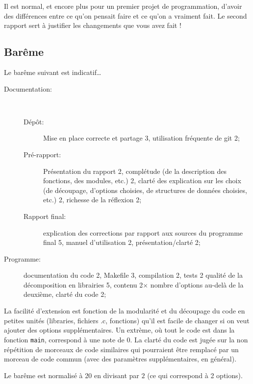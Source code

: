 \documentclass[a4paper]{article}
\begin{document}
Il est normal, et encore plus pour un premier projet de programmation,
d'avoir des différences entre ce qu'on pensait faire et ce qu'on a
vraiment fait. Le second rapport sert à justifier les changements que
vous avez fait ! 

\subsection{Bar\^eme}

Le bar\^eme suivant est indicatif\ldots
\begin{description}
\item[Documentation:] ~
  \begin{description}
  \item[Dépôt:] Mise en place correcte et partage 3, utilisation
    fréquente de git 2;
\item[Pr\'e-rapport:] Pr\'esentation du rapport 2, compl\'etude (de la description
des fonctions, des modules, etc.) 2, clart\'e des explication sur les choix (de
d\'ecoupage, d'options choisies, de structures de donn\'ees choisies, etc.) 2,
richesse de la réflexion 2;
\item[Rapport final:] explication des corrections par rapport aux
  sources du programme final 5, manuel d'utilisation 2, présentation/clart\'e 2;
\end{description}
\item[Programme:] documentation du code 2, Makefile 3, compilation 2,
  tests 2
  qualité de la décomposition en librairies 5, contenu 2$\times$
  nombre d'options au-delà de la deuxième, clarté du code 2;
\end{description}
La facilit\'e d'extension est fonction de la modularit\'e et du
d\'ecoupage du code en petites unit\'es (libraries, fichiers .c,
fonctions) qu'il est facile de changer si on veut ajouter des options
suppl\'ementaires. Un extr\`eme, o\`u tout le code est dans la
fonction \texttt{main}, correspond \`a une note de 0. La clarté du
code est jugée sur la non répétition de morceaux de code similaires qui
pourraient \^etre remplac\'e par un morceau de code commun (avec des
param\`etres suppl\'ementaires, en g\'en\'eral).

Le bar\^eme est normalis\'e \`a 20 en divisant par $2$ (ce qui correspond \`a 2 options).


\vfill



\vfill
\end{document}
